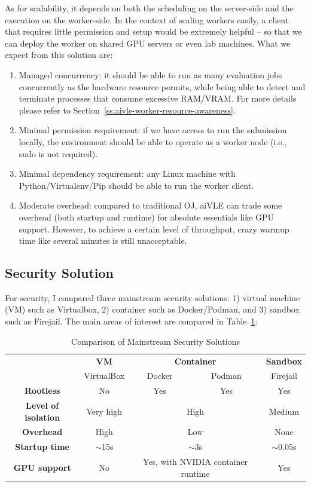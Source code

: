 As for scalability, it depends on both the scheduling on the server-side and the execution on the worker-side. In the context of scaling workers easily, a client that requires little permission and setup would be extremely helpful – so that we can deploy the worker on shared GPU servers or even lab machines. What we expect from this solution are:
\begin{enumerate}
    \item Managed concurrency: it should be able to run as many evaluation jobs concurrently as the hardware resource permits, while being able to detect and terminate processes that consume excessive RAM/VRAM. For more details please refer to Section~\ref{ss:aivle-worker-resource-awareness}.
    \item Minimal permission requirement: if we have access to run the submission locally, the environment should be able to operate as a worker node (i.e., sudo is not required).
    \item Minimal dependency requirement: any Linux machine with Python/Virtualenv/Pip should be able to run the worker client.
    \item Moderate overhead: compared to traditional OJ, aiVLE can trade some overhead (both startup and runtime) for absolute essentials like GPU support. However, to achieve a certain level of throughput, crazy warmup time like several minutes is still unacceptable.
\end{enumerate}

\subsection{Security Solution}
For security, I compared three mainstream security solutions: 1) virtual machine (VM) such as Virtualbox, 2) container such as Docker/Podman, and 3) sandbox such as Firejail. The main areas of interest are compared in Table~\ref{tab:security-solutions}:

\begin{table}[H]
\centering
\begin{tabular}{|c|c|cc|c|}
\hline
\multirow{2}{*}{} & \textbf{VM} & \multicolumn{2}{c|}{\textbf{Container}} & \textbf{Sandbox} \\ \cline{2-5} 
 & VirtualBox & \multicolumn{1}{c|}{Docker} & Podman & Firejail \\ \hline
\textbf{Rootless} & No & \multicolumn{1}{c|}{Yes} & Yes & Yes \\ \hline
\textbf{Level of isolation} & Very high & \multicolumn{2}{c|}{High} & Medium \\ \hline
\textbf{Overhead} & High & \multicolumn{2}{c|}{Low} & None \\ \hline
\textbf{Startup time} & $\sim$15s & \multicolumn{2}{c|}{$\sim$3s} & $\sim$0.05s \\ \hline
\textbf{GPU support} & No & \multicolumn{2}{c|}{Yes, with NVIDIA container runtime} & Yes \\ \hline
\end{tabular}
\caption{Comparison of Mainstream Security Solutions}
\label{tab:security-solutions}
\end{table}


